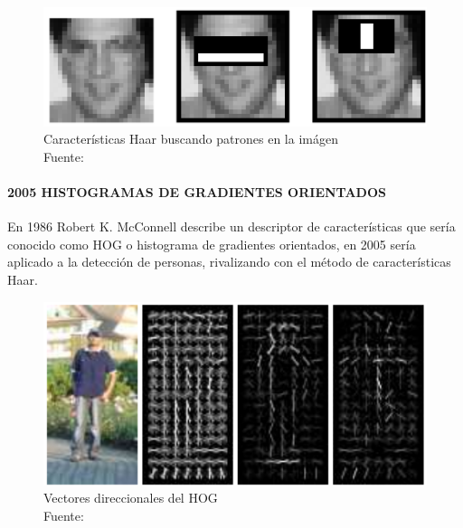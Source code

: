 \begin{figure}[H]
    \centering
    \includegraphics[scale=0.4]{imagenes/haar}
    \caption[Características HAAR]{Características Haar buscando patrones en la imágen\\Fuente: \citep{haar-cascade}}
\end{figure}
\paragraph{2005 HISTOGRAMAS DE GRADIENTES ORIENTADOS}
En 1986 Robert K. McConnell describe un descriptor de características que sería conocido como HOG o histograma de gradientes orientados, en 2005 sería aplicado a la detección de personas, rivalizando con el método de características Haar. \citep{hog-paper}

\begin{figure}[H]
    \centering
    \includegraphics[scale=0.4]{imagenes/hog}
    \caption[Vectores direccionales del HOG]{Vectores direccionales del HOG\\Fuente: \citep{hog-paper}}
\end{figure}
